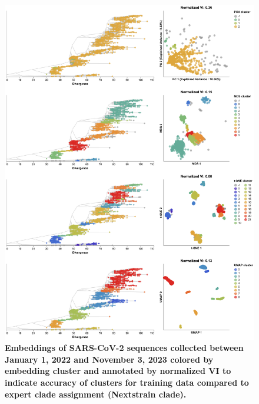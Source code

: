 \documentclass[10pt,letterpaper]{article}
\begin{document}
\begin{figure}[!h]
\includegraphics[width=\columnwidth]{figures/sarscov2-test-embeddings-by-cluster-vs-Nextstrain_clade.png}
\caption{{\bf Embeddings of SARS-CoV-2 sequences collected between January 1, 2022 and November 3, 2023 colored by embedding cluster and annotated by normalized VI to indicate accuracy of clusters for training data compared to expert clade assignment (Nextstrain clade).}
}
\label{fig:sars-cov-2-2022-2023-clusters-vs-Nextstrain-clade}
\end{figure}
\end{document}

